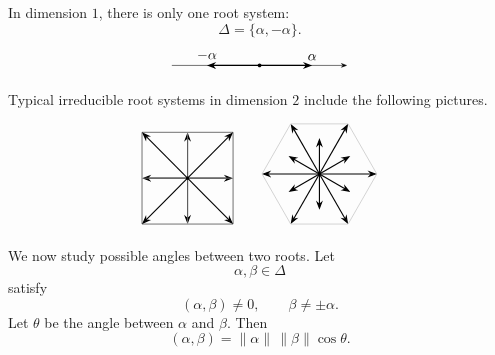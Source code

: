 \begin{example}
    In dimension \(1\), there is only one root system:
    \[
        \Delta=\{\alpha,-\alpha\}.
    \]
    \[
        \begin{tikzpicture}[scale=1.1, >=Stealth]
            \draw[->] (-2,0) -- (2,0);
            \draw[->, thick] (0,0) -- (1.2,0) node[above] {\(\alpha\)};
            \draw[->, thick] (0,0) -- (-1.2,0) node[above] {\(-\alpha\)};
            \fill (0,0) circle (1.2pt);
        \end{tikzpicture}
    \]
\end{example}

\begin{example}
    Typical irreducible root systems in dimension \(2\) include the following
    pictures.

    \[
        \begin{tikzpicture}[scale=1.15, >=Stealth]
            \foreach \x/\y in {1/0,-1/0,0/1,0/-1,1/1,-1/1,1/-1,-1/-1}
                {
                    \draw[->, thick] (0,0) -- (\x,\y);
                }
            \draw (-1,-1) -- (1,-1) -- (1,1) -- (-1,1) -- cycle;
            \draw[gray!60] (-1,0) -- (1,0);
            \draw[gray!60] (0,-1) -- (0,1);
            \fill (0,0) circle (1pt);
        \end{tikzpicture}
        \qquad
        \begin{tikzpicture}[scale=1.0, >=Stealth]
            \foreach \a in {0,60,...,300}
                {
                    \draw[->, thick] (0,0) -- ({1.45*cos(\a)},{1.45*sin(\a)});
                }
            \foreach \a in {30,90,...,330}
                {
                    \draw[->, thick] (0,0) -- ({0.9*cos(\a)},{0.9*sin(\a)});
                }
            \foreach \a in {0,60,...,300}
                {
                    \draw[gray!60] ({1.45*cos(\a)},{1.45*sin(\a)}) --
                    ({1.45*cos(\a+60)},{1.45*sin(\a+60)});
                }
            \fill (0,0) circle (1pt);
        \end{tikzpicture}
    \]
\end{example}

We now study possible angles between two roots. Let
\[
    \alpha,\beta\in\Delta
\]
satisfy
\[
    (\alpha,\beta)\neq 0,
    \qquad
    \beta\neq \pm \alpha.
\]
Let \(\theta\) be the angle between \(\alpha\) and \(\beta\). Then
\[
    (\alpha,\beta)
    =
    \|\alpha\|\,\|\beta\|\cos\theta.
\]

